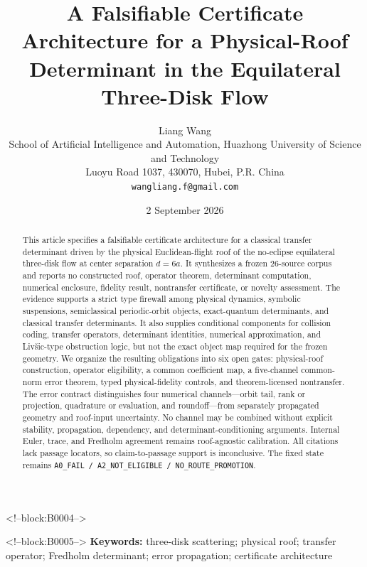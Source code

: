 \documentclass[11pt,a4paper]{article}
\title{A Falsifiable Certificate Architecture for a Physical-Roof Determinant in the Equilateral Three-Disk Flow}
\author{Liang Wang\\
\small School of Artificial Intelligence and Automation, Huazhong University of Science and Technology\\
\small Luoyu Road 1037, 430070, Hubei, P.R. China\\
\small \texttt{wangliang.f@gmail.com}}
\date{2 September 2026}
\begin{document}
\maketitle

<!--block:B0004-->
\begin{abstract}
This article specifies a falsifiable certificate architecture for a classical transfer determinant driven by the physical Euclidean-flight roof of the no-eclipse equilateral three-disk flow at center separation \(d=6a\). It synthesizes a frozen 26-source corpus and reports no constructed roof, operator theorem, determinant computation, numerical enclosure, fidelity result, nontransfer certificate, or novelty assessment. The evidence supports a strict type firewall among physical dynamics, symbolic suspensions, semiclassical periodic-orbit objects, exact-quantum determinants, and classical transfer determinants. It also supplies conditional components for collision coding, transfer operators, determinant identities, numerical approximation, and Liv\v{s}ic-type obstruction logic, but not the exact object map required for the frozen geometry. We organize the resulting obligations into six open gates: physical-roof construction, operator eligibility, a common coefficient map, a five-channel common-norm error theorem, typed physical-fidelity controls, and theorem-licensed nontransfer. The error contract distinguishes four numerical channels---orbit tail, rank or projection, quadrature or evaluation, and roundoff---from separately propagated geometry and roof-input uncertainty. No channel may be combined without explicit stability, propagation, dependency, and determinant-conditioning arguments. Internal Euler, trace, and Fredholm agreement remains roof-agnostic calibration. All citations lack passage locators, so claim-to-passage support is inconclusive. The fixed state remains \texttt{A0\_FAIL / A2\_NOT\_ELIGIBLE / NO\_ROUTE\_PROMOTION}.
\end{abstract}

<!--block:B0005-->
\noindent\textbf{Keywords:} three-disk scattering; physical roof; transfer operator; Fredholm determinant; error propagation; certificate architecture
\end{document}

